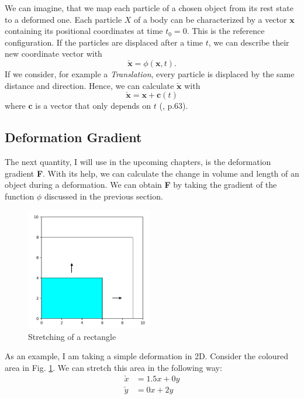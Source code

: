 We can imagine, that we map each particle of a chosen object from its rest state to a deformed one. Each particle $X$ of a body can be characterized by a vector $\mathbf{x}$ containing its positional coordinates at time $t_0=0$. This is the reference configuration. If the particles are displaced after a time $t$, we can describe their new coordinate vector with 
\[
	\check{\mathbf{x}} = \phi (\mathbf{x}, t).
\]
If we consider, for example a \textit{Translation}, every particle is displaced by the same distance and direction. Hence, we can calculate $\check{\mathbf{x}}$ with
\[
	\check{\mathbf{x}} = \mathbf{x} + \mathbf{c}(t)
\]
where $\mathbf{c}$ is a vector that only depends on $t$ (\cite{Spencer1980}, p.63).



\subsection{Deformation Gradient}
The next quantity, I will use in the upcoming chapters, is the deformation gradient \textbf{F}. With its help, we can calculate the change in volume and length of an object during a deformation. We can obtain \textbf{F} by taking the gradient of the function $\phi$ discussed in the previous section.

\begin{figure}
\centering
	\includegraphics[width=5.5cm]{resources/stretch_plot.png}
	\caption[Stretching of a rectangle]{Stretching of a rectangle}
	\label{stretch:1}
\end{figure}
As an example, I am taking a simple deformation in 2D. Consider the coloured area in Fig. \ref{stretch:1}. We can stretch this area in the following way:
\begin{align*}
	\check{x} &= 1.5x + 0y		\\
	\check{y} &= 0x + 2y	
\end{align*}

